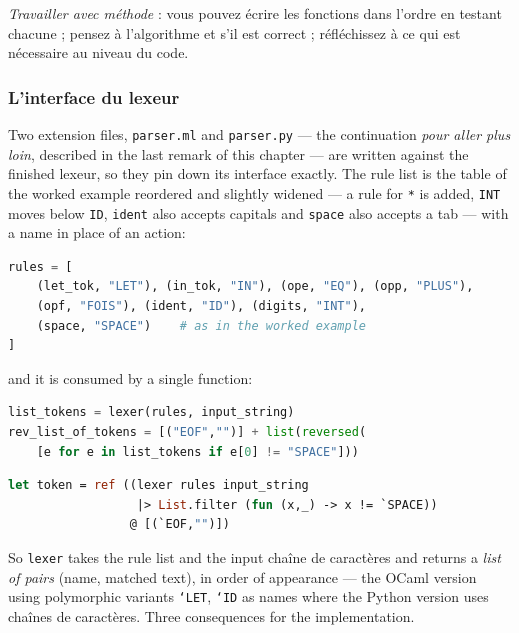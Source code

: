 \noindent
\emph{Travailler avec méthode} : vous pouvez écrire les fonctions dans l'ordre
en testant chacune ; pensez à l'algorithme et s'il est correct ; réfléchissez à
ce qui est nécessaire au niveau du code.

\subsubsection{L'interface du lexeur}
Two extension files, \texttt{parser.ml} and \texttt{parser.py} --- the
continuation \emph{pour aller plus loin}, described in the last remark of this
chapter --- are written against the finished lexeur, so they pin down its
interface exactly. The rule list is the table of the worked example reordered
and slightly widened --- a rule for \texttt{*} is added, \texttt{INT} moves
below \texttt{ID}, \texttt{ident} also accepts capitals and \texttt{space} also
accepts a tab --- with a name in place of an action:

\begin{lstlisting}[language=Python]
rules = [
    (let_tok, "LET"), (in_tok, "IN"), (ope, "EQ"), (opp, "PLUS"),
    (opf, "FOIS"), (ident, "ID"), (digits, "INT"),
    (space, "SPACE")    # as in the worked example
]
\end{lstlisting}

\noindent
and it is consumed by a single function:

\begin{lstlisting}[language=Python]
list_tokens = lexer(rules, input_string)
rev_list_of_tokens = [("EOF","")] + list(reversed(
    [e for e in list_tokens if e[0] != "SPACE"]))
\end{lstlisting}

\begin{lstlisting}[language=Caml]
let token = ref ((lexer rules input_string
                  |> List.filter (fun (x,_) -> x != `SPACE))
                 @ [(`EOF,"")])
\end{lstlisting}

So \texttt{lexer} takes the rule list and the input chaîne de caractères and
returns a \emph{list of pairs} (name, matched text), in order of appearance ---
the OCaml version using polymorphic variants \texttt{`LET}, \texttt{`ID} as
names where the Python version uses chaînes de caractères. Three consequences
for the implementation.

